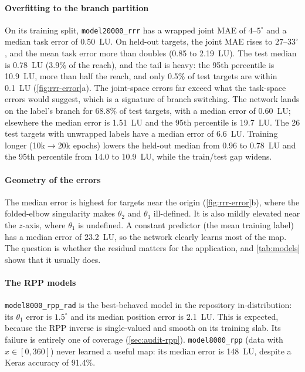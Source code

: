 \documentclass[conference]{IEEEtran}
\newcommand{\code}[1]{\texttt{#1}}
\begin{document}
\paragraph{Overfitting to the branch partition}
On its training split, \code{model20000\_rrr} has a wrapped joint MAE of $4$--$5^\circ$ and a median task error of 0.50~LU. On held-out targets, the joint MAE rises to $27$--$33^\circ$, and the mean task error more than doubles (0.85 to 2.19~LU). The test median is 0.78~LU (3.9\% of the reach), and the tail is heavy: the 95th percentile is 10.9~LU, more than half the reach, and only 0.5\% of test targets are within 0.1~LU (\cref{fig:rrr-error}a). The joint-space errors far exceed what the task-space errors would suggest, which is a signature of branch switching. The network lands on the label's branch for 68.8\% of test targets, with a median error of 0.60~LU; elsewhere the median error is 1.51~LU and the 95th percentile is 19.7~LU. The 26 test targets with unwrapped labels have a median error of 6.6~LU. Training longer (10k$\to$20k epochs) lowers the held-out median from 0.96 to 0.78~LU and the 95th percentile from 14.0 to 10.9~LU, while the train/test gap widens.

\paragraph{Geometry of the errors}
The median error is highest for targets near the origin (\cref{fig:rrr-error}b), where the folded-elbow singularity makes $\theta_2$ and $\theta_3$ ill-defined. It is also mildly elevated near the $z$-axis, where $\theta_1$ is undefined. A constant predictor (the mean training label) has a median error of 23.2~LU, so the network clearly learns most of the map. The question is whether the residual matters for the application, and \cref{tab:models} shows that it usually does.

\paragraph{The RPP models}
\code{model8000\_rpp\_rad} is the best-behaved model in the repository in-distribution: its $\theta_1$ error is $1.5^\circ$ and its median position error is 2.1~LU. This is expected, because the RPP inverse is single-valued and smooth on its training slab. Its failure is entirely one of coverage (\cref{sec:audit-rpp}). \code{model8000\_rpp} (data with $x\in[0,360]$) never learned a useful map: its median error is 148~LU, despite a Keras accuracy of 91.4\%.
\end{document}
